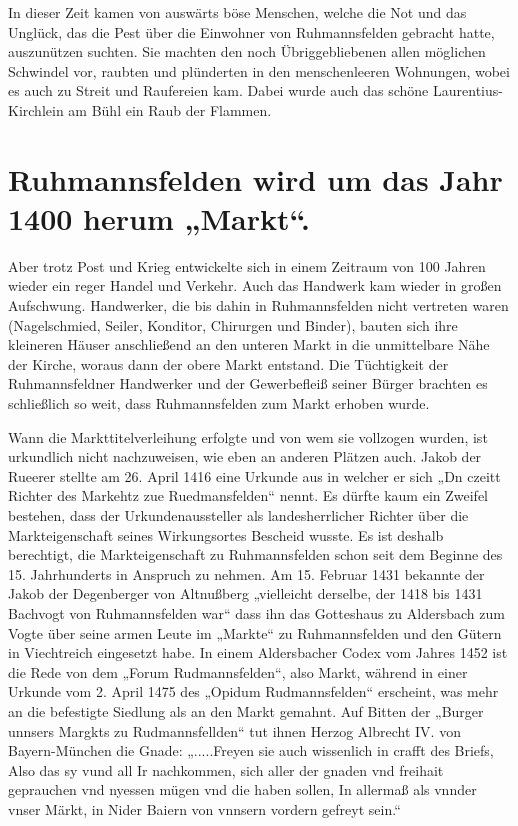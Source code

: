 \documentclass[12pt,a4paper]{book}
\begin{document}
In dieser Zeit kamen von auswärts böse Menschen, welche die Not und das
Unglück, das die Pest über die Einwohner von Ruhmannsfelden gebracht
hatte, auszunützen suchten. Sie machten den noch Übriggebliebenen allen
möglichen Schwindel vor, raubten und plünderten in den menschenleeren
Wohnungen, wobei es auch zu Streit und Raufereien kam. Dabei wurde auch
das schöne Laurentius-Kirchlein am Bühl ein Raub der Flammen.

\section[Ruhmannsfelden wird „Markt“]{Ruhmannsfelden wird um das Jahr
1400 herum „Markt“.}

Aber trotz Post und Krieg entwickelte sich in einem Zeitraum von 100
Jahren wieder ein reger Handel und Verkehr. Auch das Handwerk kam wieder
in großen Aufschwung. Handwerker, die bis dahin in Ruhmannsfelden nicht
vertreten waren (Nagelschmied, Seiler, Konditor, Chirurgen und Binder),
bauten sich ihre kleineren Häuser anschließend an den unteren Markt in
die unmittelbare Nähe der Kirche, woraus dann der obere Markt entstand.
Die Tüchtigkeit der Ruhmannsfeldner Handwerker und der Gewerbefleiß
seiner Bürger brachten es schließlich so weit, dass Ruhmannsfelden zum
Markt erhoben wurde.

Wann die Markttitelverleihung erfolgte und von wem sie vollzogen wurden,
ist urkundlich nicht nachzuweisen, wie eben an anderen Plätzen auch.
Jakob der Rueerer stellte am 26. April 1416 eine Urkunde aus in welcher
er sich „Dn czeitt Richter des Markehtz zue Ruedmansfelden“ nennt. Es
dürfte kaum ein Zweifel bestehen, dass der Urkundenaussteller als
landesherrlicher Richter über die Markteigenschaft seines Wirkungsortes
Bescheid wusste. Es ist deshalb berechtigt, die Markteigenschaft zu
Ruhmannsfelden schon seit dem Beginne des 15. Jahrhunderts in Anspruch
zu nehmen. Am 15. Februar 1431 bekannte der Jakob der Degenberger von
Altnußberg „vielleicht derselbe, der 1418 bis 1431 Bachvogt von
Ruhmannsfelden war“ dass ihn das Gotteshaus zu Aldersbach zum Vogte über
seine armen Leute im „Markte“ zu Ruhmannsfelden und den Gütern in
Viechtreich eingesetzt habe. In einem Aldersbacher Codex vom Jahres 1452
ist die Rede von dem „Forum Rudmannsfelden“, also Markt, während in
einer Urkunde vom 2. April 1475 des „Opidum Rudmannsfelden“ erscheint,
was mehr an die befestigte Siedlung als an den Markt gemahnt. Auf Bitten
der „Burger unnsers Margkts zu Rudmannsfellden“ tut ihnen Herzog
Albrecht IV. von Bayern-München die Gnade: „.....Freyen sie auch
wissenlich in crafft des Briefs, Also das sy vund all Ir nachkommen,
sich aller der gnaden vnd freihait geprauchen vnd nyessen mügen vnd die
haben sollen, In allermaß als vnnder vnser Märkt, in Nider Baiern von
vnnsern vordern gefreyt sein.“
\end{document}
